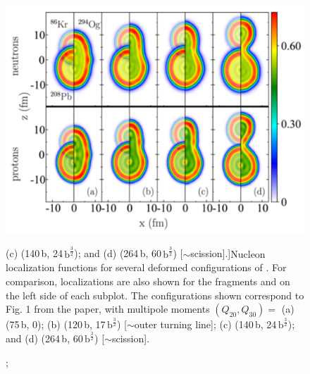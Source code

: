 \begin{figure}
	\centering
	\includegraphics[width=0.9\linewidth]{TeX_files/294Og_locali}
	\caption[Nucleon localization functions for several deformed configurations of {\Og}. For comparison, localizations are also shown for the fragments {\Pb} and {\Kr} on the left side of each subplot. The configurations shown correspond to Fig. 1 from the paper, with multipole moments $(Q_{20}, Q_{30})=$ (a) (75\,b, 0); (b) (120\,b, 17\,$\mathrm{b}^\frac{3}{2}$) [${\sim}$outer turning line]; (c) (140\,b, 24\,$\mathrm{b}^\frac{3}{2}$); and (d) (264\,b, 60\,$\mathrm{b}^\frac{3}{2}$) [${\sim}$scission].]{Nucleon localization functions for several deformed configurations of {\Og}. For comparison, localizations are also shown for the fragments {\Pb} and {\Kr} on the left side of each subplot. The configurations shown correspond to Fig. 1 from the paper, with multipole moments $(Q_{20}, Q_{30})=$ (a) (75\,b, 0); (b) (120\,b, 17\,$\mathrm{b}^\frac{3}{2}$) [${\sim}$outer turning line]; (c) (140\,b, 24\,$\mathrm{b}^\frac{3}{2}$); and (d) (264\,b, 60\,$\mathrm{b}^\frac{3}{2}$) [${\sim}$scission].}
	\label{fig:294oglocali}
\end{figure}



